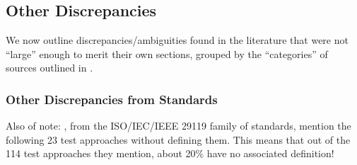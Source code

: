 

\subsection{Other Discrepancies}
\label{other-discrep}

We now outline discrepancies/ambiguities found in the literature that were not
``large'' enough to merit their own sections, grouped by the ``categories'' of
sources outlined in .


\subsubsection{Other Discrepancies from Standards}


\ifnotpaper
      Also of note: \citep{IEEE2022, IEEE2021}, from the
      ISO/IEC/IEEE 29119 family of standards, mention the following 23 test
      approaches without defining them. This means that out of the 114 test
      approaches they mention, about 20\% have no associated definition!

